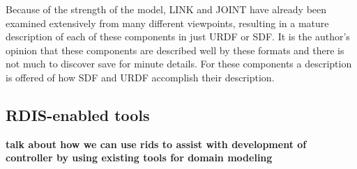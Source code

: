 Because of the strength of the model, LINK and JOINT have already been examined extensively from many different viewpoints, resulting in a mature description of each of these components in just URDF or SDF. It is the author's opinion that these components are described well by these formats and there is not much to discover save for minute details. For these components a description is offered of how SDF and URDF accomplish their description.

\subsection{RDIS-enabled tools}
{\bf talk about how we can use rids to assist with development of controller by using existing tools for domain modeling}
